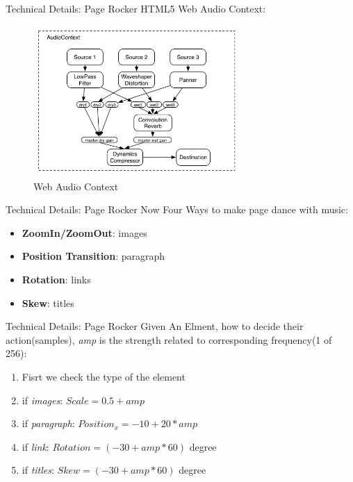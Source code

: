 \documentclass{beamer}
\begin{document}
\begin{frame}{Technical Details: Page Rocker}
HTML5 Web Audio Context:
\begin{center}
    \begin{figure}
        \includegraphics[width=0.7\textwidth]{./images/audiocontext.png}
        \caption{Web Audio Context}
    \end{figure}
\end{center}
\end{frame}

\begin{frame}{Technical Details: Page Rocker}
Now Four Ways to make page dance with music:
\begin{itemize}
    \item \textbf{ZoomIn/ZoomOut}: images
    \item \textbf{Position Transition}: paragraph
    \item \textbf{Rotation}: links
    \item \textbf{Skew}: titles
\end{itemize}
\end{frame}

\begin{frame}{Technical Details: Page Rocker}
    Given An Elment, how to decide their action(samples), \emph{amp} is the strength related to corresponding frequency(1 of 256):
\begin{enumerate}
    \item Fisrt we check the type of the element
    \item if \emph{images}: $Scale = 0.5 + amp $
    \item if \emph{paragraph}: $Position_{x} = -10 + 20 * amp$
    \item if \emph{link}: $Rotation = (-30 + amp * 60)$ degree
    \item if \emph{titles}: $Skew = (-30 + amp * 60)$ degree
\end{enumerate}
\end{frame}
\end{document}
